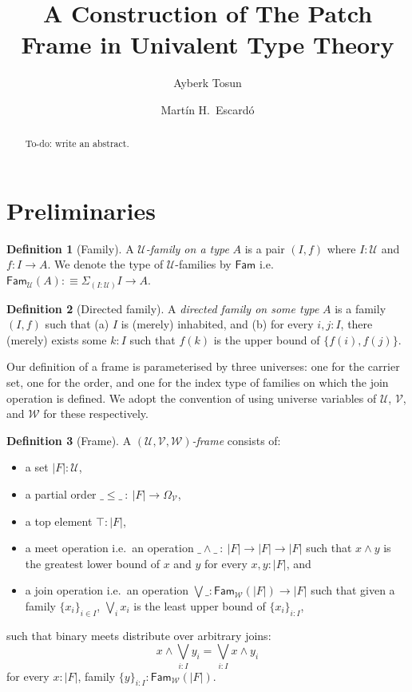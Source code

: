 \documentclass[a4paper, 11pt]{article}
\title{A Construction of The Patch Frame in Univalent Type Theory}
\author{Ayberk Tosun \and Mart\'{i}n H.\ Escard\'{o}}
\theoremstyle{definition}
\newtheorem{defn}{Definition}
\newcommand{\UU}{\mathcal{U}}
\newcommand{\VV}{\mathcal{V}}
\newcommand{\WW}{\mathcal{W}}
\newcommand{\Fam}[2]{\mathsf{Fam}_{#1}\left(#2\right)}
\newcommand{\define}[1]{\emph{#1}}
\newcommand{\todo}[1]{{\large\color{orange}\textsf{To-do: #1.}}}
\begin{document}
\maketitle

\begin{abstract}
  \todo{write an abstract}
\end{abstract}

\section{Preliminaries}

\begin{defn}[Family]
  A \define{$\UU$-family on a type} $A$ is a pair $(I, f)$ where $I : \UU$ and $f : I \rightarrow A$. We
  denote the type of $\UU$-families by $\mathsf{Fam}$ i.e.\ $\Fam{\UU}{A} :\equiv \Sigma_{(I : \UU)} I \rightarrow A$.
\end{defn}

\begin{defn}[Directed family]
  A \define{directed family on some type} $A$ is a family $(I, f)$ such that (a) $I$ is (merely)
  inhabited, and (b) for every $i, j : I$, there (merely) exists some $k : I$ such that $f(k)$ is
  the upper bound of $\{ f(i), f(j) \}$.
\end{defn}

Our definition of a frame is parameterised by three universes: one for the carrier set, one for the
order, and one for the index type of families on which the join operation is defined. We adopt the
convention of using universe variables of $\UU$, $\VV$, and $\WW$ for these respectively.

\begin{defn}[Frame]
  A \define{$(\UU, \VV, \WW)$-frame} consists of:
  \begin{itemize}
    \item a set $| F | : \UU$,
    \item a partial order $\_\le\_\ :\ | F | \rightarrow \Omega_\VV$,
    \item a top element $\top : | F |$,
    \item a meet operation i.e.\ an operation $\_\wedge\_\ :\ | F | \rightarrow | F | \rightarrow | F |$ such that $x \wedge y$ is
      the greatest lower bound of $x$ and $y$ for every $x, y : | F |$, and
    \item a join operation i.e.\ an operation $\bigvee\_ : \mathsf{Fam}_{\WW}(| F |) \rightarrow
      | F |$ such that given a family $\{ x_i \}_{i \in I}$, $\bigvee_i x_i$ is the least upper bound
      of $\{ x_i \}_{i : I}$,
  \end{itemize}
  such that binary meets distribute over arbitrary joins:
  \begin{equation*}
    x \wedge \bigvee_{i : I} y_i = \bigvee_{i : I} x \wedge y_i
  \end{equation*}
  for every $x : | F |$, family $\{ y \}_{i : I} : \mathsf{Fam}_{\WW}(| F |)$.
\end{defn}
\end{document}
